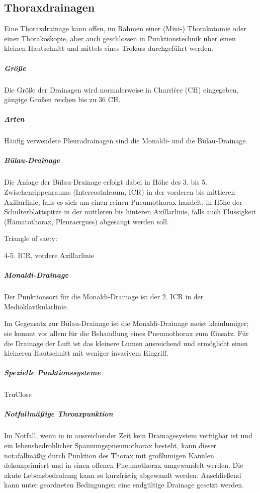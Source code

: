\subsection{Thoraxdrainagen}

{%
Eine Thoraxdrainage kann offen, im Rahmen einer (Mini-) Thorakotomie 
oder einer Thorakoskopie, 
aber auch geschlossen in Punktionstechnik über einen kleinen Hautschnitt 
und mittels eines Trokars durchgeführt werden. 
\cite{wiki:thoraxdrainge-20150127}




\subparagraph{Größe} Die Größe der Drainagen wird normalerweise in Charrière 
(CH) eingegeben, gängige Größen reichen bis zu 36 CH.

\subparagraph{Arten} 
Häufig verwendete Pleuradrainagen sind die Monaldi- und die Bülau-Drainage. 

\subparagraph{Bülau-Drainage}
Die 
Anlage der Bülau-Drainage erfolgt dabei in 
Höhe des 3. bis 5. Zwischenrippenraums (Intercostalraum, ICR) in der vorderen 
bis mittleren Axillarlinie, falls es sich um einen reinen Pneumothorax handelt, 
in Höhe der Schulterblattspitze in der mittleren bis hinteren Axillarlinie, 
falls auch Flüssigkeit (Hämatothorax, Pleuraerguss) abgesaugt werden soll. 
\cite{wiki:thoraxdrainge-20150127}

Triangle of saety: 

4-5. ICR, vordere Axillarlinie

\cite{youtube:ChestTubeInsertion}

\subparagraph{Monaldi-Drainage}
Der Punktionsort für die Monaldi-Drainage ist der 2. ICR 
in der Medioklavikularlinie.

Im Gegensatz zur Bülau-Drainage ist die Monaldi-Drainage meist  
kleinlumiger; sie kommt vor allem für die Behandlung eines Pneumothorax zum 
Einsatz. Für die Drainage der Luft 
ist das kleinere Lumen ausreichend und ermöglicht einen kleineren Hautschnitt 
mit weniger invasivem Eingriff.  \cite{wiki:thoraxdrainge-20150127}

\subparagraph{Spezielle Punktionssysteme}
TruClose
\cite{youtube:Tru-CloseThroracicVent}

\subparagraph{Notfallmäßige Throaxpunktion}
Im Notfall, wenn in in ausreichender Zeit kein Drainagesystem verfügbar ist 
und ein lebensbedrohlicher Spannungspneumothorax 
besteht, 
kann dieser notafallmäßig durch Punktion des Thorax mit  
großlumigen Kanülen dekomprimiert 
und in einen offenen Pneumothorax umgewandelt werden.
%
Die akute Lebensbedrohung kann so kurzfristig abgewandt werden. 
%
Anschließend kann unter geordneten Bedingungen eine endgültige Drainage gesetzt 
werden. \cite{wiki:thoraxdrainge-20150127}



}

